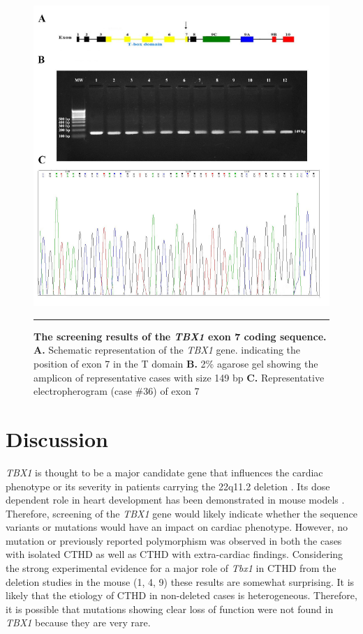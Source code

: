 \begin{refsection}
\begin{figure}[!thbp]
\centering
\includegraphics[width=\linewidth]{Figures/Figure4_9TBX7.pdf}
\rule{35em}{0.5pt}
\caption{\textbf{The screening results of the \textit{TBX1} exon 7 coding sequence.}
\textbf{A.} Schematic representation of the \textit{TBX1} gene. indicating the position of exon 7 in the T domain \textbf{B.} 2\% agarose gel showing the amplicon of representative cases with size 149 bp \textbf{C.} Representative electropherogram (case \#36) of exon 7}
\label{fig:4_9}
\end{figure}



\section{Discussion}


\textit{TBX1} is thought to be a major candidate gene that influences the cardiac phenotype or its severity in patients carrying the 22q11.2 deletion \cite{gong2001mutation}. Its dose dependent role in heart development has been demonstrated in mouse models \cite{chieffo1997isolation, lindsay1999congenital, lindsay2001tbx1}. Therefore, screening of the \textit{TBX1} gene would likely indicate whether the sequence variants or mutations would have an impact on cardiac phenotype. However, no mutation or previously reported polymorphism was observed in both the cases with isolated CTHD as well as CTHD with extra-cardiac findings. Considering the strong experimental evidence for a major role of \textit{Tbx1} in CTHD from the deletion studies in the mouse (1, 4, 9) these results are somewhat surprising. It is likely that the etiology of CTHD in non-deleted cases is heterogeneous. Therefore, it is possible that mutations showing clear loss of function were not found in \textit{TBX1} because they are very rare.


\end{refsection}
